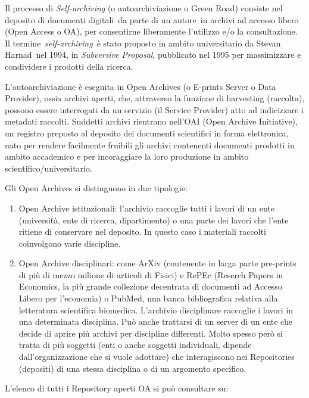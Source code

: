 \documentclass[
  b5paper,
  twoside,
  12pt,
  chapterprefix=false,
  bibliography=totocnumbered,
  parskip=false]{scrbook}
\begin{document}
Il processo di \emph{Self-archiving} (o autoarchiviazione o Green Road)
consiste nel deposito di documenti digitali~da parte di un autore~in
archivi ad accesso libero (Open Access o OA), per consentirne
liberamente l'utilizzo e/o la consultazione. Il
termine~\emph{self-archiving}~è stato proposto in ambito universitario da
Stevan Harnad~nel 1994, in \emph{Subversive Proposal}, pubblicato nel 1995
per massimizzare e condividere i prodotti della ricerca.

L'autoarchiviazione è eseguita in Open Archives (o E-prints Server o
Data Provider), ossia archivi aperti, che, attraverso la funzione di
harvesting (raccolta), possono essere interrogati da un servizio (il
Service Provider) atto ad indicizzare i metadati raccolti. Suddetti
archivi rientrano nell'OAI (Open Archive Initiative), un registro
preposto al deposito dei documenti scientifici in forma elettronica,
nato per rendere facilmente fruibili gli archivi contenenti documenti
prodotti in ambito accademico e per incoraggiare la loro produzione in
ambito scientifico/universitario.

Gli Open Archives si distinguono in due tipologie:

\begin{enumerate}
\def\labelenumi{\arabic{enumi}.}
\item
  Open Archive istituzionali: l'archivio raccoglie tutti i lavori di
  un ente (università, ente di ricerca, dipartimento) o una parte dei
  lavori che l'ente ritiene di conservare nel deposito. In questo caso
  i materiali raccolti coinvolgono varie discipline.
\item
  Open Archive disciplinari: come ArXiv (contenente in larga parte
  pre-prints di più di mezzo milione di articoli di Fisici) e RePEc
  (Reserch Papers in Economics, la più grande collezione decentrata di
  documenti ad Accesso Libero per l'economia) o PubMed, una banca
  bibliografica relativa alla letteratura scientifica biomedica.
  L'archivio disciplinare raccoglie i lavori in una determinata
  disciplina. Può anche trattarsi di un server di un ente che decide
  di aprire più archivi per discipline differenti. Molto spesso però
  si tratta di più soggetti (enti o anche soggetti individuali,
  dipende dall'organizzazione che si vuole adottare) che interagiscono
  nei Repositories (depositi) di una stessa disciplina o di un
  argomento specifico.
\end{enumerate}

L'elenco di tutti i Repository aperti OA si può consultare su:
\end{document}
